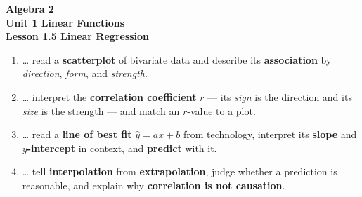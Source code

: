 \documentclass[10pt]{article}
\begin{document}
\vspace{-0.8in}

\begin{center}
  {\color{white}\textbf{\LARGE Algebra 2}}\\[4pt]
  {\color{forestmid}\large\textbf{Unit 1 \quad Linear Functions}}\\[6pt]
  {\color{white}\textbf{\large Lesson 1.5 \quad Linear Regression}}
\end{center}

\vspace{0.22in}
\namedateperiod
\vspace{0.18in}

\begin{learningtargetbox}
\small
\begin{enumerate}[leftmargin=1.5em, itemsep=5pt]
  \item \ldots{} read a \textbf{scatterplot} of bivariate data and describe its
        \textbf{association} by \emph{direction}, \emph{form}, and \emph{strength}.
  \item \ldots{} interpret the \textbf{correlation coefficient} $r$ --- its \emph{sign} is the
        direction and its \emph{size} is the strength --- and match an $r$-value to a plot.
  \item \ldots{} read a \textbf{line of best fit} $\hat y=ax+b$ from technology, interpret its
        \textbf{slope} and \textbf{$y$-intercept} in context, and \textbf{predict} with it.
  \item \ldots{} tell \textbf{interpolation} from \textbf{extrapolation}, judge whether a
        prediction is reasonable, and explain why \textbf{correlation is not causation}.
\end{enumerate}
\end{learningtargetbox}

\vspace{0.14in}
\end{document}
